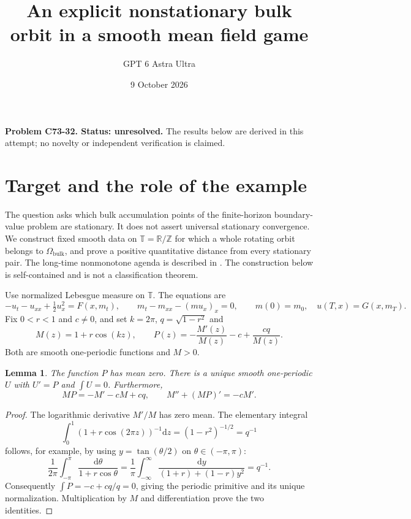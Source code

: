 \documentclass[11pt]{article}
\title{An explicit nonstationary bulk orbit in a smooth mean field game}
\author{GPT 6 Astra Ultra}
\date{9 October 2026}
\newtheorem{lemma}[theorem]{Lemma}
\newcommand{\R}{\mathbb R}
\newcommand{\Z}{\mathbb Z}
\newcommand{\T}{\mathbb T}
\newcommand{\dd}{\mathrm d}
\begin{document}
\maketitle
\noindent\textbf{Problem C73-32. Status: unresolved.} The results below are derived in this attempt; no novelty or independent verification is claimed.

\section{Target and the role of the example}
The question asks which bulk accumulation points of the finite-horizon boundary-value problem are stationary. It does not assert universal stationary convergence. We construct fixed smooth data on $\T=\R/\Z$ for which a whole rotating orbit belongs to $\Omega_{\mathrm{bulk}}$, and prove a positive quantitative distance from every stationary pair. The long-time nonmonotone agenda is described in \cite[Section 3.3]{CD}. The construction below is self-contained and is not a classification theorem.

Use normalized Lebesgue measure on $\T$. The equations are
\begin{equation}\label{MFG}
 -u_t-u_{xx}+\tfrac12u_x^2=F(x,m_t),\qquad
 m_t-m_{xx}-(mu_x)_x=0,\qquad
 m(0)=m_0,\quad u(T,x)=G(x,m_T).
\end{equation}
Fix $0<r<1$ and $c\ne0$, and set $k=2\pi$, $q=\sqrt{1-r^2}$ and
\begin{equation}\label{profiles}
 M(z)=1+r\cos(kz),\qquad
 P(z)=-\frac{M'(z)}{M(z)}-c+\frac{cq}{M(z)}.
\end{equation}
Both are smooth one-periodic functions and $M>0$.

\begin{lemma}\label{profilelemma}
The function $P$ has mean zero. There is a unique smooth one-periodic $U$ with $U'=P$ and $\int U=0$. Furthermore,
\[
 MP=-M'-cM+cq,\qquad M''+(MP)'=-cM'.
\]
\end{lemma}
\begin{proof}
The logarithmic derivative $M'/M$ has zero mean. The elementary integral
\[
 \int_0^1(1+r\cos(2\pi z))^{-1}\dd z=(1-r^2)^{-1/2}=q^{-1}
\]
follows, for example, by using $y=\tan(\theta/2)$ on $\theta\in(-\pi,\pi)$:
\[
 \frac1{2\pi}\int_{-\pi}^{\pi}\frac{\dd\theta}{1+r\cos\theta}
 =\frac1\pi\int_{-\infty}^{\infty}\frac{\dd y}{(1+r)+(1-r)y^2}=q^{-1}.
\]
Consequently $\int P=-c+cq/q=0$, giving the periodic primitive and its unique normalization. Multiplication by $M$ and differentiation prove the two identities.
\end{proof}
\end{document}
